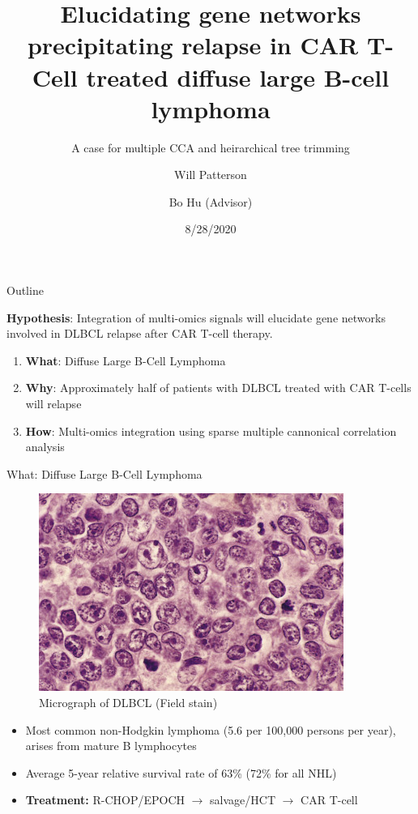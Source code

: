 \documentclass[ignorenonframetext,]{beamer}
\title{Elucidating gene networks precipitating relapse in CAR T-Cell treated
diffuse large B-cell lymphoma}
\subtitle{A case for multiple CCA and heirarchical tree trimming}
\author{Will Patterson \and Bo Hu (Advisor)}
\date{8/28/2020}
\begin{document}
\frame{\titlepage}

\begin{frame}{Outline}
\protect\hypertarget{outline}{}

\textbf{Hypothesis}: Integration of multi-omics signals will elucidate
gene networks involved in DLBCL relapse after CAR T-cell therapy.

\begin{enumerate}
\item
  \textbf{What}: Diffuse Large B-Cell Lymphoma
\item
  \textbf{Why}: Approximately half of patients with DLBCL treated with
  CAR T-cells will relapse
\item
  \textbf{How}: Multi-omics integration using sparse multiple cannonical
  correlation analysis
\end{enumerate}

\end{frame}

\begin{frame}{What: Diffuse Large B-Cell Lymphoma}
\protect\hypertarget{what-diffuse-large-b-cell-lymphoma}{}

\begin{figure}

{\centering \includegraphics[width=0.4\linewidth]{images/dlbcl_stain} 

}

\caption{Micrograph of DLBCL (Field stain)}\label{fig:unnamed-chunk-1}
\end{figure}

\begin{itemize}
\item
  Most common non-Hodgkin lymphoma (5.6 per 100,000 persons per year),
  arises from mature B lymphocytes
\item
  Average 5-year relative survival rate of 63\% (72\% for all NHL)
\item
  \textbf{Treatment:} R-CHOP/EPOCH \(\rightarrow\) salvage/HCT
  \(\rightarrow\) CAR T-cell
\end{itemize}

\end{frame}
\end{document}
